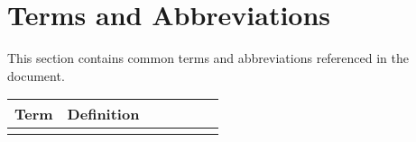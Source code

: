 \thispagestyle{empty}

\section*{Terms and Abbreviations}

This section contains common terms and abbreviations referenced in the document.

\begin{tabular}[h]{rp{0.75\linewidth}}
    \hline
    \textbf{Term} & \textbf{Definition}\\
    \hline
    &\\
    \hline

\end{tabular}
